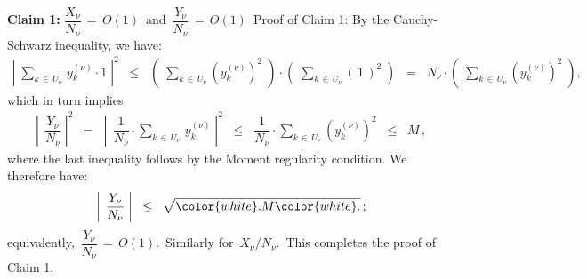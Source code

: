 \begin{enumerate}
    \vskip 0.3cm
    \noindent
    \textbf{Claim 1:}\quad
    $\dfrac{X_{\nu}}{N_{\nu}} \,=\, O(1)$\;\,
    and
    \;\,$\dfrac{Y_{\nu}}{N_{\nu}} \,=\, O(1)$\,
    \vskip 0.1cm
    \noindent
    Proof of Claim 1:\;\;
    By the Cauchy-Schwarz inequality, we have:
    \begin{eqnarray*}
    \left\vert\;
        \underset{k\,\in\,U_{\nu}}{\sum}\,
        y^{(\nu)}_{k} \cdot 1
        \;\right\vert^{2}
    \;\; \leq \;\;
        \left(\;
            \underset{k\,\in\,U_{\nu}}{\sum}
            (y^{(\nu)}_{k})^{2}
            \;\right)
        \cdot
        \left(\;
            \underset{k\,\in\,U_{\nu}}{\sum}
            (\,1\,)^{2}
            \;\right)
    \;\; = \;\;
        N_{\nu}
        \cdot
        \left(\;
            \underset{k\,\in\,U_{\nu}}{\sum}
            (y^{(\nu)}_{k})^{2}
            \;\right),
    \end{eqnarray*}
    which in turn implies
    \begin{eqnarray*}
    \left\vert\;\,
        \dfrac{Y_{\nu}}{N_{\nu}}
        \;\right\vert^{2}
    \;\; = \;\;
        \left\vert\;\,
            \dfrac{1}{N_{\nu}}
            \cdot
            \underset{k\,\in\,U_{\nu}}{\sum}\,
            y^{(\nu)}_{k}
            \;\right\vert^{2}
    \;\; \leq \;\;
        \dfrac{1}{N_{\nu}}
        \cdot
        \underset{k\,\in\,U_{\nu}}{\sum}
        (y^{(\nu)}_{k})^{2}
    \;\; \leq \;\;
        M\,,
    \end{eqnarray*}
    where the last inequality follows by the Moment regularity condition.
    We therefore have:
    \begin{eqnarray*}
    \left\vert\;\,
        \dfrac{Y_{\nu}}{N_{\nu}}
        \;\right\vert
    \;\; \leq \;\;
        \sqrt{{\color{white}.}M{\color{white}.}}\,;
    \end{eqnarray*}
    equivalently,
    \,$
    \dfrac{Y_{\nu}}{N_{\nu}} \,=\, O(1)
    $.\,
    Similarly for \,$X_{\nu} \slash N_{\nu}$.\,
    This completes the proof of Claim 1.


\end{enumerate}
